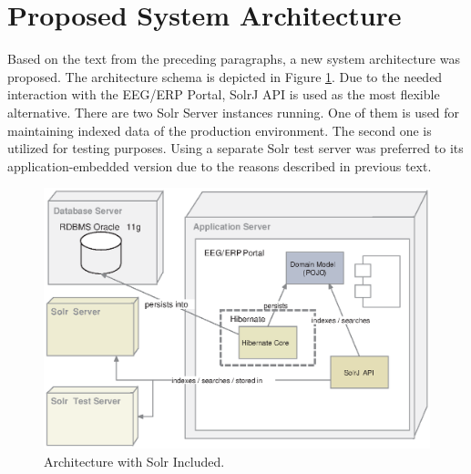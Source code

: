 

\section{Proposed System Architecture}

Based on the text from the preceding paragraphs, a new system architecture was proposed.
The architecture schema is depicted in Figure \ref{fig:solrNewArchitecture}.
Due to the needed interaction with the EEG/ERP Portal, SolrJ API is used as the most flexible alternative.
There are two Solr Server instances running.
One of them is used for maintaining indexed data of the production environment.
The second one is utilized for testing purposes.
Using a separate Solr test server was preferred to its application-embedded version due to the reasons described in previous text.




\begin{figure}[h]
	\centering
		\includegraphics[width=1.00\textwidth]{figures/solrNewArchitecture.eps}
	\caption{Architecture with Solr Included.}
	\label{fig:solrNewArchitecture}
\end{figure}
